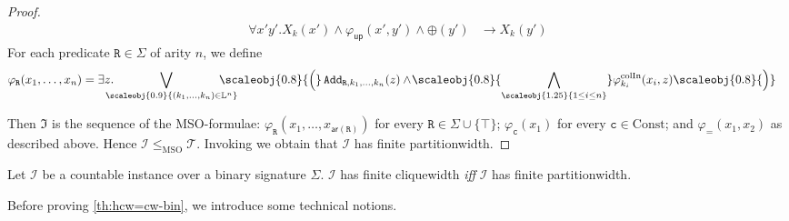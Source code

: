 \documentclass[10pt,a4paper]{amsart}
\theoremstyle{definition}
\numberwithin{equation}{section}
\theoremstyle{plain}
\theoremstyle{definition}
\theoremstyle{myexample}
\theoremstyle{plain}
\newenvironment{customprop}[1]
  {\renewcommand\theinnercustomprop{#1}\innercustomprop}
  {\endinnercustomprop}
\theoremstyle{definition}
\newcommand{\instance}{\mathcal{I}}
\newcommand{\inst}{\instance}
\newcommand{\cols}{\mathbb{L}}
\newcommand{\arity}[1]{\fcn{ar}(#1)}
\newcommand{\ercwidth}{\partitionwidth}
\newcommand{\partitionwidth}{par\-ti\-tion\-width}
\newcommand{\fcn}[1]{\mathsf{#1}}
\newcommand{\pred}[1]{\mathtt{#1}}
\newcommand{\const}[1]{\mathtt{#1}}
\newcommand{\thephi}{\varphi}
\newcommand{\rpred}{\pred{R}}
\newcommand{\iffi}{\textit{iff} } %
\newcommand{\defend}{\hfill\ensuremath{\Diamond}}
\begin{document}
\begin{proof}
\begin{align*}
    		\forall x'\!y'\!. X_k(x') \wedge \thephi_\fcn{up}(x'\!,y') \wedge \oplus(y') & \to X_{k}(y')
    	\end{align*}
    	For each predicate $\rpred\in \Sigma$ of arity $n$, we define
    	\begin{align*}
    		\varphi_{\rpred}(x_1,\ldots,x_n) & = 
    		\exists z.\hspace{-4ex}
    		\bigvee_{\hspace{2ex}
    			\scaleobj{0.9}{(k_1,\ldots,k_n) \in \cols^n}
    		}\hspace{-4ex} 
    		\scaleobj{0.8}{\Big(}
    		\,\pred{Add}_{\rpred,k_1,\ldots,k_n}(z) \wedge\! \scaleobj{0.8}{\bigwedge_{\scaleobj{1.25}{1 \leq i \leq n}}} \varphi^\mathrm{colIn}_{k_i}(x_i,z) 
    		\scaleobj{0.8}{\Big)}
    	\end{align*}
    	
    	Then $\mathfrak{I}$ is the sequence of the MSO-formulae: $\varphi_{\rpred}(x_1, \ldots, x_{\arity{\rpred}})$ for every $\rpred\in\Sigma{\cup}\{ \top \}$; $\varphi_{\const{c}}(x_1)$ for every $\const{c}\in\mathrm{Const}$; and $\varphi_{=}(x_1, x_2)$ as described above.
    	Hence $\inst \leq_{\text{MSO}} \mathcal{T}$. Invoking  we obtain that $\inst$ has finite \partitionwidth{}.
\end{proof}


\begin{customprop}{\ref{th:hcw=cw-bin}}
	Let $\inst$ be a countable instance over a binary signature $\Sigma$.
	$\inst$ has finite cliquewidth \iffi $\inst$ has finite \ercwidth{}.
\end{customprop}


Before proving \cref{th:hcw=cw-bin}, we introduce some technical notions.
\end{document}
